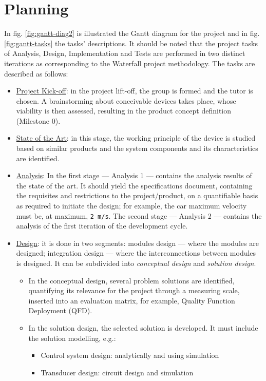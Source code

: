 \documentclass[11pt]{article}
\begin{document}
\section{Planning}
\label{sec:org290d8c0}
In fig. \ref{fig:gantt-diag2} is illustrated the Gantt diagram for the project and in
fig. \ref{fig:gantt-tasks} the tasks' descriptions. It should be noted that the project
tasks of Analysis, Design, Implementation and Tests are performed in two
distinct iterations as corresponding to the Waterfall project methodology. The
tasks are described as follows:
\begin{itemize}
\item \uline{Project Kick-off}: in the project lift-off, the group is formed and the tutor
is chosen. A brainstorming about conceivable devices takes place, whose
viability is then assessed, resulting in the product concept definition
(Milestone 0).
\item \uline{State of the Art}: in this stage, the working principle of the device is
studied based on similar products and the system components and its
characteristics are identified.
\item \uline{Analysis}: In the first stage --- Analysis 1 --- contains the analysis
results of the state of the art. It should yield the specifications document,
containing the requisites and restrictions to the project/product, on a
quantifiable basis as required to initiate the design; for example, the
car maximum velocity must be, at maximum, \texttt{2 m/s}. The second stage --- Analysis 2
--- contains the analysis of the first iteration of the development cycle.
\item \uline{Design}: it is done in two segments: modules design --- where the modules are
designed; integration design --- where the interconnections between modules is
designed. It can be subdivided into \emph{conceptual design} and \emph{solution
design}. 
\begin{itemize}
\item In the conceptual design, several problem solutions are identified,
quantifying its relevance for the project through a measuring scale,
inserted into an evaluation matrix, for example, Quality Function Deployment
(QFD).
\item In the solution design, the selected solution is developed. It must include
the solution modelling, e.g.:
\begin{itemize}
\item Control system design: analytically and using simulation
\item Transducer design: circuit design and simulation

\end{itemize}
\end{itemize}
\end{itemize}
\end{document}
